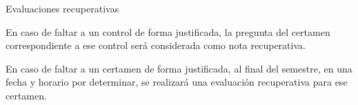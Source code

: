 
\begin{frame}
  \begin{block}{Evaluaciones recuperativas}
    \par En caso de faltar a un control de forma justificada, la pregunta del certamen correspondiente a ese control será considerada como nota recuperativa.
    \vspace{2mm}
    \par En caso de faltar a un certamen de forma justificada, al final del semestre, en una fecha y horario por determinar, se realizará una evaluación recuperativa para ese certamen.
  \end{block}
\end{frame}


